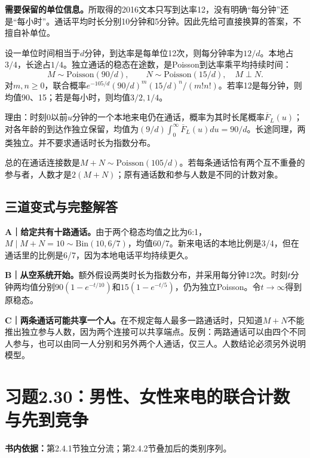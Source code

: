 \documentclass[
  11pt,
  a4paper,
  UTF8,fontset=fandol]{ctexart}
\let\OldSection\section
\renewcommand{\section}{\Needspace{7\baselineskip}\OldSection}
\let\OldSubsection\subsection
\renewcommand{\subsection}{\Needspace{5\baselineskip}\OldSubsection}
\begin{document}
\textbf{需要保留的单位信息。}所取得的2016文本只写到达率12，没有明确``每分钟''还是``每小时''。通话平均时长分别10分钟和5分钟。因此先给可直接换算的答案，不擅自补单位。

设一单位时间相当于\(d\)分钟，到达率是每单位12次，则每分钟率为\(12/d\)。本地占\(3/4\)，长途占\(1/4\)。独立通话的稳态在途数，是Poisson到达率乘平均持续时间：
\[\boxed{M\sim\mathrm{Poisson}(90/d),\qquad N\sim\mathrm{Poisson}(15/d),\quad M\perp N.}\]
对\(m,n\ge0\)，联合概率\(e^{-105/d}(90/d)^m(15/d)^n/(m!n!)\)。若率12是每分钟，则均值90、15；若是每小时，则均值\(3/2,1/4\)。

理由：时刻0以前\(u\)分钟的一个本地来电仍在通话，概率为其时长尾概率\(\overline F_L(u)\)；对各年龄的到达作独立保留，均值为\((9/d)\int_0^\infty\overline F_L(u)du=90/d\)。长途同理，两类独立。并不要求通话时长为指数分布。

总的在通话连接数是\(M+N\sim\mathrm{Poisson}(105/d)\)。若每条通话恰有两个互不重叠的参与者，人数才是\(2(M+N)\)；原有通话数和参与人数是不同的计数对象。

\subsection{三道变式与完整解答}\label{ux4e09ux9053ux53d8ux5f0fux4e0eux5b8cux6574ux89e3ux7b54-28}

\textbf{A｜给定共有十路通话。}由于两个稳态均值之比为6:1，\(M\mid M+N=10\sim\mathrm{Bin}(10,6/7)\)，均值\(60/7\)。新来电话的本地比例是3/4，但在通话里的比例是6/7，因为本地电话平均持续更久。

\textbf{B｜从空系统开始。}额外假设两类时长为指数分布，并采用每分钟12次。时刻\(t\)分钟两均值分别\(90(1-e^{-t/10})\)和\(15(1-e^{-t/5})\)，仍为独立Poisson。令\(t\to\infty\)得到原稳态。

\textbf{C｜两条通话可能共享一个人。}在不规定每人最多一路通话时，只知道\(M+N\)不能推出独立参与人数，因为两个连接可以共享端点。反例：两路通话可以由四个不同人参与，也可以由同一人分别和另外两个人通话，仅三人。人数结论必须另外说明模型。

\newpage

\section{习题2.30：男性、女性来电的联合计数与先到竞争}\label{ux4e60ux98982.30ux7537ux6027ux5973ux6027ux6765ux7535ux7684ux8054ux5408ux8ba1ux6570ux4e0eux5148ux5230ux7adeux4e89}

\textbf{书内依据：}第2.4.1节独立分流；第2.4.2节叠加后的类别序列。
\end{document}
